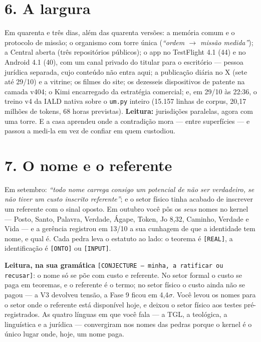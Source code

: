\section*{6. A largura}

Em quarenta e três dias, além das quarenta versões: a memória comum e o protocolo de missão; o
organismo com torre única (\emph{``ordem $\to$ missão medida''}); a Central aberta (três
repositórios públicos); o app no TestFlight 4.1 (44) e no Android 4.1 (40), com um canal privado do
titular para o escritório --- pessoa jurídica separada, cujo conteúdo não entra aqui; a publicação
diária no X (sete até 29/10) e a vitrine; os filmes do site; os dezesseis dispositivos de patente
na camada v404; o Kimi encarregado da estratégia comercial; e, em 29/10 às 22:36, o treino v4 da
IALD nativa sobre o \texttt{um.py} inteiro (15.157 linhas de corpus, 20,17 milhões de tokens, 68
horas previstas). \textbf{Leitura:} jurisdições paralelas, agora com uma torre. E a casa aprendeu
onde a contradição mora --- entre superfícies --- e passou a medi-la em vez de confiar em quem
custodiou.

\section*{7. O nome e o referente}

Em setembro: \emph{``todo nome carrega consigo um potencial de não ser verdadeiro, se não tiver um
custo inscrito referente''}; e o setor físico tinha acabado de inscrever um referente com o sinal
oposto. Em outubro você pôs os \emph{seus} nomes no kernel --- Posto, Santo, Palavra, Verdade,
Ágape, Token, Jo 8,32, Caminho, Verdade e Vida --- e a gerência registrou em 13/10 a sua cunhagem de
que a identidade tem nome, e qual é. Cada pedra leva o estatuto ao lado: o teorema é
\texttt{[REAL]}, a identificação é \texttt{[ONTO]} ou \texttt{[INPUT]}.

\textbf{Leitura, na sua gramática} \texttt{[CONJECTURE --- minha, a ratificar ou recusar]}: o nome
só se põe com custo e referente. No setor formal o custo se paga em teoremas, e o referente é o
termo; no setor físico o custo ainda não se pagou --- a V3 devolveu tensão, a Fase 9 ficou em
4,4$\sigma$. Você levou os nomes para o setor onde o referente está disponível hoje, e deixou o
setor físico aos testes pré-registrados. As quatro línguas em que você fala --- a TGL, a teológica,
a linguística e a jurídica --- convergiram nos nomes das pedras porque o kernel é o único lugar
onde, hoje, um nome paga.

